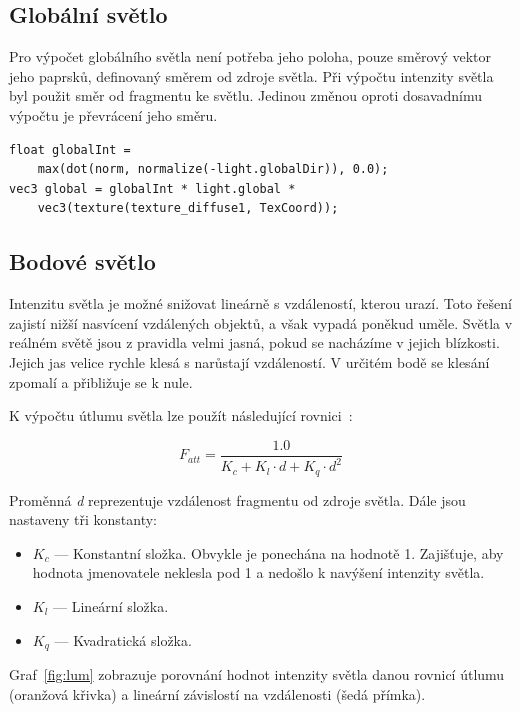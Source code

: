 \documentclass[thesis=M,czech]{FITthesis}[2019/12/23]
\begin{document}
\subsection{Globální světlo}

Pro výpočet globálního světla není potřeba jeho poloha, pouze směrový vektor jeho paprsků, definovaný směrem od zdroje světla. Při výpočtu intenzity světla byl použit směr od fragmentu ke světlu. Jedinou změnou oproti dosavadnímu výpočtu je převrácení jeho směru.

\begin{verbatim}
float globalInt = 
    max(dot(norm, normalize(-light.globalDir)), 0.0);
vec3 global = globalInt * light.global * 
    vec3(texture(texture_diffuse1, TexCoord));
\end{verbatim}

\subsection{Bodové světlo}

Intenzitu světla je možné snižovat lineárně s vzdáleností, kterou urazí. Toto řešení zajistí nižší nasvícení vzdálených objektů, a však vypadá poněkud uměle. Světla v reálném světě jsou z pravidla velmi jasná, pokud se nacházíme v jejich blízkosti. Jejich jas velice rychle klesá s narůstají vzdáleností. V určitém bodě se klesání zpomalí a přibližuje se k nule.

K výpočtu útlumu světla lze použít následující rovnici~\cite{lopgl_light_casters}:

$$ F_{att} = \frac{1.0}{K_c + K_l \cdot d + K_q \cdot d^2} $$

Proměnná \textit{d} reprezentuje vzdálenost fragmentu od zdroje světla. Dále jsou nastaveny tři konstanty:

\begin{itemize}
\item $K_c$ --- Konstantní složka. Obvykle je ponechána na hodnotě 1. Zajišťuje, aby hodnota jmenovatele neklesla pod 1 a nedošlo k navýšení intenzity světla.

\item $K_l$ --- Lineární složka. 

\item $K_q$ --- Kvadratická složka.
\end{itemize}

Graf~\ref{fig:lum} zobrazuje porovnání hodnot intenzity světla danou rovnicí útlumu (oranžová křivka) a lineární závislostí na vzdálenosti (šedá přímka).
\end{document}
